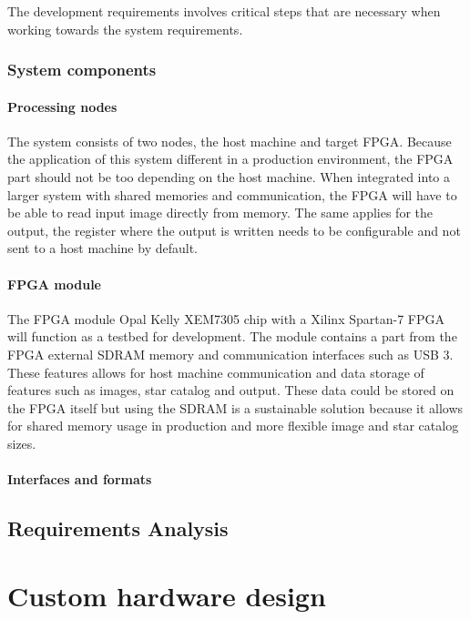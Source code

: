 \documentclass[12pt]{report}
\begin{document}
The development requirements involves critical steps that are necessary when working towards the system requirements.

\subsection{System components}
\subsubsection{Processing nodes}
The system consists of two nodes, the host machine and target FPGA. Because the application of this system different in a production environment, the FPGA part should not be too depending on the host machine. When integrated into a larger system with shared memories and communication, the FPGA will have to be able to read input image directly from memory. The same applies for the output, the register where the output is written needs to be configurable and not sent to a host machine by default.

\subsubsection{FPGA module}
The FPGA module Opal Kelly XEM7305 chip with a Xilinx Spartan-7 FPGA will function as a testbed for development. The module contains a part from the FPGA external SDRAM memory and communication interfaces such as USB 3. These features allows for host machine communication and data storage of features such as images, star catalog and output. These data could be stored on the FPGA itself but using the SDRAM is a sustainable solution because it allows for shared memory usage in production and more flexible image and star catalog sizes.

\subsubsection{Interfaces and formats}

\section{Requirements Analysis}



\chapter{Custom hardware design}
\end{document}
